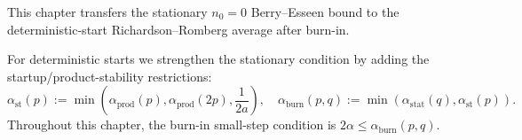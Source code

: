 

This chapter transfers the stationary $n_{0} = 0$ Berry--Esseen bound to the
deterministic-start Richardson--Romberg average after burn-in.


For deterministic starts we strengthen the stationary condition by adding the
startup/product-stability restrictions:
\begin{equation}
\alpha_{\mathrm{st}}(p)
  := \min (
    \alpha_{\mathrm{prod}}(p),
    \alpha_{\mathrm{prod}}(2p),
    \frac{1}{2 a}
  ),
\quad
\alpha_{\mathrm{burn}}(p,q)
  := \min (
    \alpha_{\mathrm{stat}}(q),
    \alpha_{\mathrm{st}}(p)
  ).
\label{eq:alpha-admissibility-thresholds}
\end{equation}
Throughout this chapter, the burn-in small-step condition is
$2 \alpha \le \alpha_{\mathrm{burn}}(p,q)$.
